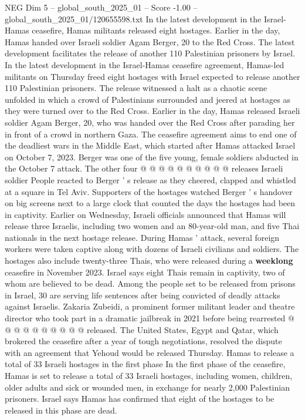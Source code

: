 \begin{textsample}{NEG Dim 5 – global\_south\_2025\_01 – Score -1.00 – global\_south\_2025\_01/120655598.txt}  \label{ex:f5_neg_152}
In the latest development in the Israel-Hamas ceasefire, Hamas militants released eight hostages.
Earlier in the day, Hamas handed over Israeli soldier Agam Berger, 20 to the Red Cross.
The latest development facilitates the release of another 110 Palestinian prisoners by Israel.
In the latest development in the Israel-Hamas ceasefire agreement, Hamas-led militants on Thursday freed eight hostages with Israel expected to release another 110 Palestinian prisoners.
The release witnessed a halt as a chaotic scene unfolded in which a crowd of Palestinians surrounded and jeered at hostages as they were turned over to the Red Cross.
Earlier in the day, Hamas released Israeli soldier Agam Berger, 20, who was handed over the Red Cross after parading her in front of a crowd in northern Gaza.
The ceasefire agreement aims to end one of the deadliest wars in the Middle East, which started after Hamas attacked Israel on October 7, 2023.
Berger was one of the five young, female soldiers abducted in the October 7 attack.
The other four @ @ @ @ @ @ @ @ @ @ releases Israeli soldier People reacted to Berger ' s release as they cheered, clapped and whistled at a square in Tel Aviv.
Supporters of the hostages watched Berger ' s handover on big screens next to a large clock that counted the days the hostages had been in captivity.
Earlier on Wednesday, Israeli officials announced that Hamas will release three Israelis, including two women and an 80-year-old man, and five Thai nationals in the next hostage release.
During Hamas ' attack, several foreign workers were taken captive along with dozens of Israeli civilians and soldiers.
The hostages also include twenty-three Thais, who were released during a \textbf{weeklong} ceasefire in November 2023.
Israel says eight Thais remain in captivity, two of whom are believed to be dead.
Among the people set to be released from prisons in Israel, 30 are serving life sentences after being convicted of deadly attacks against Israelis.
Zakaria Zubeidi, a prominent former militant leader and theatre director who took part in a dramatic jailbreak in 2021 before being rearrested @ @ @ @ @ @ @ @ @ @ released.
The United States, Egypt and Qatar, which brokered the ceasefire after a year of tough negotiations, resolved the dispute with an agreement that Yehoud would be released Thursday.
Hamas to release a total of 33 Israeli hostages in the first phase In the first phase of the ceasefire, Hamas is set to release a total of 33 Israeli hostages, including women, children, older adults and sick or wounded men, in exchange for nearly 2,000 Palestinian prisoners.
Israel says Hamas has confirmed that eight of the hostages to be released in this phase are dead.

\end{textsample}

